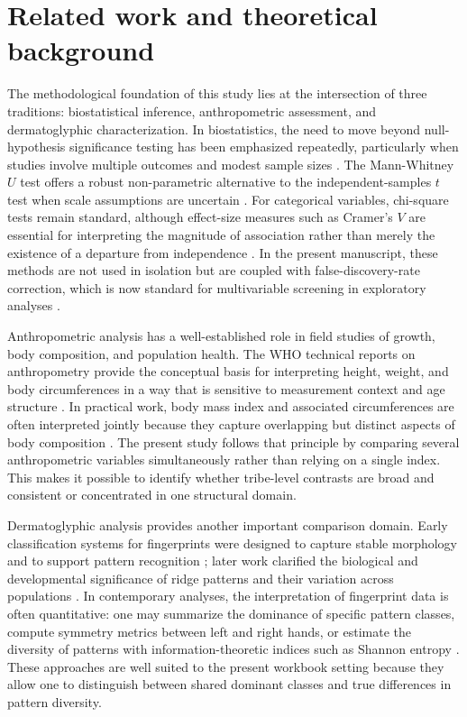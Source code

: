\documentclass[11pt]{article}
\begin{document}
\section{Related work and theoretical background}
The methodological foundation of this study lies at the intersection of three traditions: biostatistical inference, anthropometric assessment, and dermatoglyphic characterization. In biostatistics, the need to move beyond null-hypothesis significance testing has been emphasized repeatedly, particularly when studies involve multiple outcomes and modest sample sizes \cite{cohen1988,benjamini1995}. The Mann-Whitney $U$ test offers a robust non-parametric alternative to the independent-samples $t$ test when scale assumptions are uncertain \cite{mann1947,wilcoxon1945}. For categorical variables, chi-square tests remain standard, although effect-size measures such as Cramer's $V$ are essential for interpreting the magnitude of association rather than merely the existence of a departure from independence \cite{cramer1946,agresti2013}. In the present manuscript, these methods are not used in isolation but are coupled with false-discovery-rate correction, which is now standard for multivariable screening in exploratory analyses \cite{benjamini1995}.

Anthropometric analysis has a well-established role in field studies of growth, body composition, and population health. The WHO technical reports on anthropometry provide the conceptual basis for interpreting height, weight, and body circumferences in a way that is sensitive to measurement context and age structure \cite{who1995,who2000}. In practical work, body mass index and associated circumferences are often interpreted jointly because they capture overlapping but distinct aspects of body composition \cite{wells2006}. The present study follows that principle by comparing several anthropometric variables simultaneously rather than relying on a single index. This makes it possible to identify whether tribe-level contrasts are broad and consistent or concentrated in one structural domain.

Dermatoglyphic analysis provides another important comparison domain. Early classification systems for fingerprints were designed to capture stable morphology and to support pattern recognition \cite{galton1892,henry1900}; later work clarified the biological and developmental significance of ridge patterns and their variation across populations \cite{cummins1961,holt1968}. In contemporary analyses, the interpretation of fingerprint data is often quantitative: one may summarize the dominance of specific pattern classes, compute symmetry metrics between left and right hands, or estimate the diversity of patterns with information-theoretic indices such as Shannon entropy \cite{shannon1948}. These approaches are well suited to the present workbook setting because they allow one to distinguish between shared dominant classes and true differences in pattern diversity.
\end{document}
